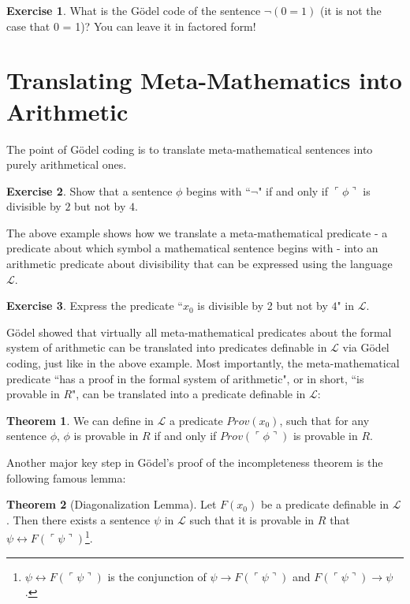 \documentclass[11pt]{article}
\theoremstyle{definition}
\newtheorem{exer}{Exercise}
\newtheorem{theorem}{Theorem}[section]
\begin{document}
\begin{exer}
What is the G\"odel code of the sentence $\neg (0=1)$ (it is not the case that 0 = 1)? You can leave it in factored form!
\end{exer}

\section{Translating Meta-Mathematics into Arithmetic}

The point of G\"odel coding is to translate meta-mathematical sentences into purely arithmetical ones.

\begin{exer}
Show that a sentence $\phi$ begins with ``$\neg$" if and only if $\ulcorner \phi \urcorner$ is divisible by $2$ but not by $4$.
\end{exer}

The above example shows how we translate a meta-mathematical predicate - a predicate about which symbol a mathematical sentence begins with - into an arithmetic predicate about divisibility that can be expressed using the language $\mathscr{L}$.

\begin{exer}
Express the predicate ``$x_0$ is divisible by 2 but not by $4$" in $\mathscr{L}$.
\end{exer}

G\"odel showed that virtually all meta-mathematical predicates about the formal system of arithmetic can be translated into predicates definable in $\mathscr{L}$ via G\"odel coding, just like in the above example. Most importantly, the meta-mathematical predicate ``has a proof in the formal system of arithmetic", or in short, ``is provable in $R$", can be translated into a predicate definable in $\mathscr{L}$:

\begin{theorem}\label{Prov}
We can define in $\mathscr{L}$ a predicate $Prov(x_0)$, such that for any sentence $\phi$, $\phi$ is provable in $R$ if and only if $Prov(\ulcorner \phi \urcorner)$ is provable in $R$.
\end{theorem}

Another major key step in G\"odel's proof of the incompleteness theorem is the following famous lemma:

\begin{theorem}[Diagonalization Lemma] Let $F(x_0)$ be a predicate definable in $\mathscr{L}$. Then there exists a sentence $\psi$ in $\mathscr{L}$ such that it is provable in $R$ that $\psi \leftrightarrow F(\ulcorner \psi \urcorner )$\footnote{$\psi \leftrightarrow F(\ulcorner \psi \urcorner)$ is the conjunction of $\psi \rightarrow F(\ulcorner \psi \urcorner)$ and $F(\ulcorner \psi \urcorner) \rightarrow \psi$.}.

\end{theorem}
\end{document}
